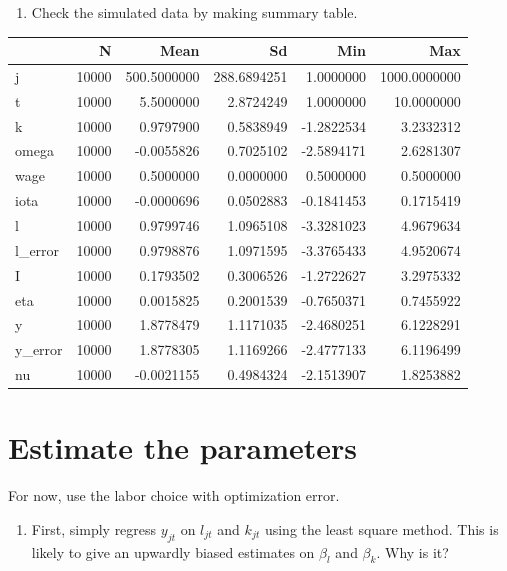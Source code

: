 \documentclass[]{book}
\providecommand{\tightlist}{%
  \setlength{\itemsep}{0pt}\setlength{\parskip}{0pt}}
\begin{document}
\begin{enumerate}
\def\labelenumi{\arabic{enumi}.}
\setcounter{enumi}{9}
\tightlist
\item
  Check the simulated data by making summary table.
\end{enumerate}

\begin{tabular}{l|r|r|r|r|r}
\hline
  & N & Mean & Sd & Min & Max\\
\hline
j & 10000 & 500.5000000 & 288.6894251 & 1.0000000 & 1000.0000000\\
\hline
t & 10000 & 5.5000000 & 2.8724249 & 1.0000000 & 10.0000000\\
\hline
k & 10000 & 0.9797900 & 0.5838949 & -1.2822534 & 3.2332312\\
\hline
omega & 10000 & -0.0055826 & 0.7025102 & -2.5894171 & 2.6281307\\
\hline
wage & 10000 & 0.5000000 & 0.0000000 & 0.5000000 & 0.5000000\\
\hline
iota & 10000 & -0.0000696 & 0.0502883 & -0.1841453 & 0.1715419\\
\hline
l & 10000 & 0.9799746 & 1.0965108 & -3.3281023 & 4.9679634\\
\hline
l\_error & 10000 & 0.9798876 & 1.0971595 & -3.3765433 & 4.9520674\\
\hline
I & 10000 & 0.1793502 & 0.3006526 & -1.2722627 & 3.2975332\\
\hline
eta & 10000 & 0.0015825 & 0.2001539 & -0.7650371 & 0.7455922\\
\hline
y & 10000 & 1.8778479 & 1.1171035 & -2.4680251 & 6.1228291\\
\hline
y\_error & 10000 & 1.8778305 & 1.1169266 & -2.4777133 & 6.1196499\\
\hline
nu & 10000 & -0.0021155 & 0.4984324 & -2.1513907 & 1.8253882\\
\hline
\end{tabular}

\section{Estimate the parameters}\label{estimate-the-parameters}

For now, use the labor choice with optimization error.

\begin{enumerate}
\def\labelenumi{\arabic{enumi}.}
\tightlist
\item
  First, simply regress \(y_{jt}\) on \(l_{jt}\) and \(k_{jt}\) using
  the least square method. This is likely to give an upwardly biased
  estimates on \(\beta_l\) and \(\beta_k\). Why is it?
\end{enumerate}
\end{document}
